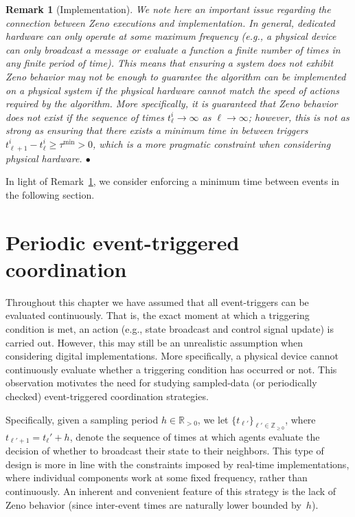 \documentclass[]{book}
\newtheorem{remark}[theorem]{Remark}
\newcommand{\realpositive}{\mathbb{R}_{>0}}
\newcommand{\integernonnegative}{\mathbb{Z}_{\ge 0}}
\newcommand{\oprocendsymbol}{\hbox{$\bullet$}}
\newcommand{\oprocend}{\relax\ifmmode\else\unskip\hfill\fi\oprocendsymbol}
\begin{document}
\begin{remark}[Implementation]\label{re:zeno} {\rm We note here an
    important issue regarding the connection between Zeno executions
    and implementation.  In general, dedicated hardware can only
    operate at some maximum frequency (e.g., a physical device can
    only broadcast a message or evaluate a function a finite number of
    times in any finite period of time). This means that ensuring a
    system does not exhibit Zeno behavior may not be enough to
    guarantee the algorithm can be implemented on a physical system if
    the physical hardware cannot match the speed of actions required
    by the algorithm. More specifically, it is guaranteed that Zeno
    behavior does not exist if the sequence of times $t_\ell^i
    \rightarrow \infty$ as $\ell \rightarrow \infty$; however, this is
    not as strong as ensuring that there exists a minimum time in
    between triggers $t_{\ell+1}^i - t_\ell^i \geq \tau^\text{min} >
    0$, which is a more pragmatic constraint when considering physical
    hardware.  } \oprocend
\end{remark}

In light of Remark~\ref{re:zeno}, we consider enforcing a minimum time
between events in the following section.

\section{Periodic event-triggered coordination}

Throughout this chapter we have assumed that all event-triggers can be
evaluated continuously.  That is, the exact moment at which a
triggering condition is met, an action (e.g., state broadcast and
control signal update) is carried out. However, this may still be an
unrealistic assumption when considering digital implementations. More
specifically, a physical device cannot continuously evaluate whether a
triggering condition has occurred or not. This observation motivates
the need for studying sampled-data (or periodically checked)
event-triggered coordination strategies.

Specifically, given a sampling period $h \in \realpositive$, we let
$\{ t_{\ell'} \}_{\ell' \in \integernonnegative}$, where $t_{\ell'+1}
= t_\ell' + h$, denote the sequence of times at which agents evaluate
the decision of whether to broadcast their state to their
neighbors. This type of design is more in line with the constraints
imposed by real-time implementations, where individual components work
at some fixed frequency, rather than continuously. An inherent and
convenient feature of this strategy is the lack of Zeno behavior
(since inter-event times are naturally lower bounded by~$h$).
\end{document}
